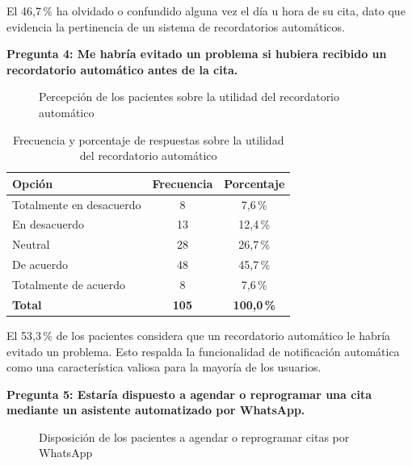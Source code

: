 \smallskip
El 46{,}7\,\% ha olvidado o confundido alguna vez el día u hora de su cita, dato que
evidencia la pertinencia de un sistema de recordatorios automáticos.

\medskip
\textbf{Pregunta 4: Me habría evitado un problema si hubiera recibido un recordatorio automático antes de la cita.}

\begin{figure}[H]
\centering
{}
\caption{Percepción de los pacientes sobre la utilidad del recordatorio automático}
\label{fig:p4_torta}
\end{figure}

\begin{table}[H]
\centering
\caption{Frecuencia y porcentaje de respuestas sobre la utilidad del recordatorio automático}
\label{tab:p4_frecuencia}
\fontsize{10}{12}\selectfont
\renewcommand{\arraystretch}{1.2}
\begin{tabular}{|l|c|c|}
\hline
\textbf{Opción} & \textbf{Frecuencia} & \textbf{Porcentaje} \\ \hline
Totalmente en desacuerdo & 8 & 7{,}6\,\% \\ \hline
En desacuerdo & 13 & 12{,}4\,\% \\ \hline
Neutral & 28 & 26{,}7\,\% \\ \hline
De acuerdo & 48 & 45{,}7\,\% \\ \hline
Totalmente de acuerdo & 8 & 7{,}6\,\% \\ \hline
\textbf{Total} & \textbf{105} & \textbf{100{,}0\,\%} \\ \hline
\end{tabular}
\end{table}

\smallskip
El 53{,}3\,\% de los pacientes considera que un recordatorio automático le habría evitado
un problema. Esto respalda la funcionalidad de notificación automática como una característica
valiosa para la mayoría de los usuarios.

\medskip
\textbf{Pregunta 5: Estaría dispuesto a agendar o reprogramar una cita mediante un asistente automatizado por WhatsApp.}

\begin{figure}[H]
\centering
{}
\caption{Disposición de los pacientes a agendar o reprogramar citas por WhatsApp}
\label{fig:p5_torta}
\end{figure}

